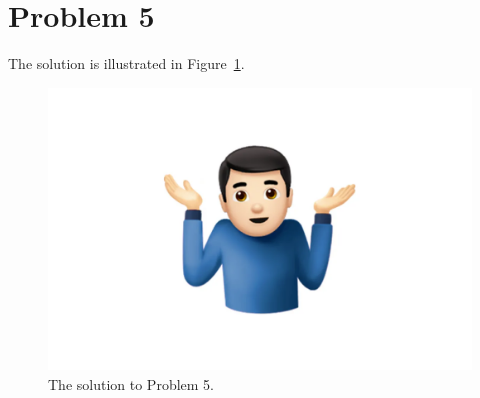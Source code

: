 \section{Problem 5}

The solution is illustrated in Figure~\ref{fig:problem-5}.

\begin{figure}
  \centering
  \includegraphics[width=\textwidth,keepaspectratio]{figures/problem5.png}
  \caption{The solution to Problem 5.}
  \label{fig:problem-5}
\end{figure}